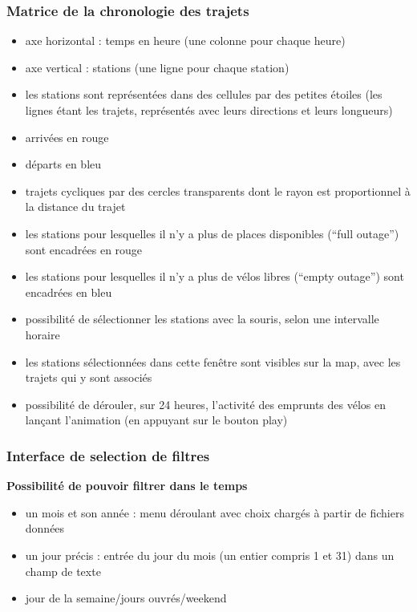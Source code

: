 \documentclass[12pt]{article}
\begin{document}
			\subsubsection{Matrice de la chronologie des trajets}
				\begin{itemize}
					\item axe horizontal : temps en heure (une colonne pour chaque heure)
					\item axe vertical : stations (une ligne pour chaque station)
					\item les stations sont représentées dans des cellules par des petites étoiles (les lignes étant les trajets, représentés avec leurs directions et leurs longueurs)
					\item arrivées en rouge
					\item départs en bleu
					\item trajets cycliques par des cercles transparents dont le rayon est proportionnel à la distance du trajet
					\item les stations pour lesquelles il n’y a plus de places disponibles (“full outage”) sont encadrées en rouge
					\item les stations pour lesquelles il n’y a plus de vélos libres (“empty outage”) sont encadrées en bleu
					\item possibilité de sélectionner les stations avec la souris, selon une intervalle horaire
					\item les stations sélectionnées dans cette fenêtre sont visibles sur la map, avec les trajets qui y sont associés
					\item possibilité de dérouler, sur 24 heures, l'activité des emprunts des vélos en lançant l'animation (en appuyant sur le bouton play)
				\end{itemize}

			\subsubsection{Interface de selection de filtres}
				\textbf{Possibilité de pouvoir filtrer dans le temps}\\
					\begin{itemize}
						\item un mois et son année : menu déroulant avec choix chargés à partir de fichiers données
						\item un jour précis : entrée du jour du mois (un entier compris 1 et 31) dans un champ de texte 
						\item jour de la semaine/jours ouvrés/weekend
					\end{itemize}
\end{document}
